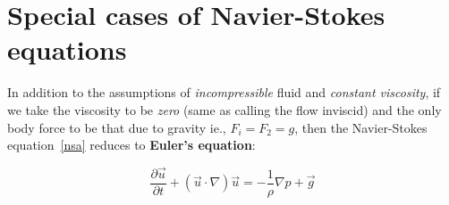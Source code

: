 \section{Special cases of Navier-Stokes equations}

In addition to the assumptions of {\em incompressible} fluid and {\em constant viscosity}, if we take the viscosity to be {\em zero} (same as calling the flow inviscid) and the only body force to be that due to gravity ie., $F_i = F_2 = g$, then the Navier-Stokes equation~\ref{nsa} reduces to {\bf Euler's equation}:

\begin{equation}
\label{eulereqn}
\boxed{
\frac{\partial \vec{u}}{\partial t} + \left( \vec{u}\cdot\nabla\right) \vec{u} = -\frac{1}{\rho} \nabla p + \vec{g}
}
\end{equation} 


